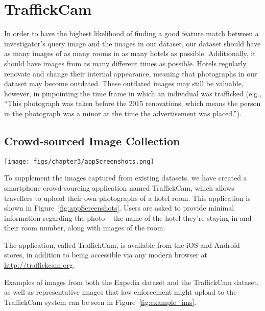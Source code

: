 
\chapter{TraffickCam}
\label{ch:3}

In order to have the highest likelihood of finding a good feature match between a investigator's query image and the images in our dataset, our dataset should have as many images of as many rooms in as many hotels as possible. Additionally, it should have images from as many different times as possible. Hotels regularly renovate and change their internal appearance, meaning that photographs in our dataset may become outdated. These outdated images may still be valuable, however, in pinpointing the time frame in which an individual was trafficked (e.g., ``This photograph was taken before the 2015 renovations, which means the person in the photograph was a minor at the time the advertisement was placed.'').

\section{Crowd-sourced Image Collection}
\begin{figure*}[ht!]
  \begin{center}
    \texttt{[image: figs/chapter3/appScreenshots.png]}
  \end{center}
  \caption[Smartphone app screenshots.]{Screenshots of the smartphone app, TraffickCam, that allows anyone to contribute to the database. The app is designed to require minimal user time and to protect the user's identity.}
  \label{fig:appScreenshots}
\end{figure*}

To supplement the images captured from existing datasets, we have created a smartphone crowd-sourcing application named TraffickCam, which allows travellers to upload their own photographs of a hotel room. This application is shown in Figure~\ref{fig:appScreenshots}. Users are asked to provide minimal information regarding the photo -- the name of the hotel they're staying in and their room number, along with images of the room.

The application, called TraffickCam, is available from the iOS and Android stores, in addition to being accessible via any modern browser at \url{http://traffickcam.org}.

Examples of images from both the Expedia dataset and the TraffickCam dataset, as well as representative images that law enforcement might upload to the TraffickCam system can be seen in Figure~\ref{fig:example_ims}.

